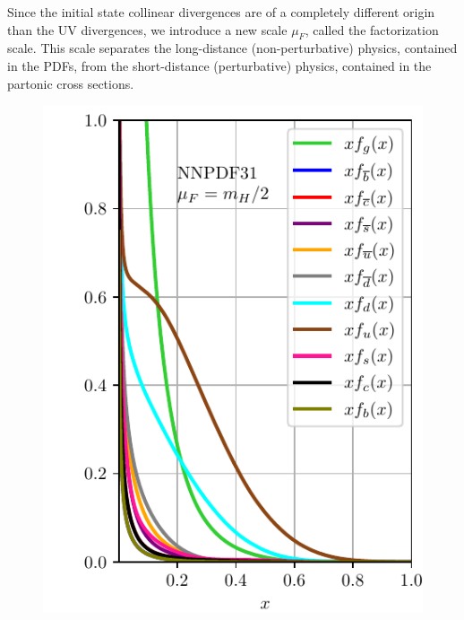 Since the initial state collinear divergences are of a completely different origin than the \acs{UV} divergences, we introduce a new scale $\mu_F$, called the factorization scale. This scale separates the long-distance (non-perturbative) physics, contained in the PDFs, from the short-distance (perturbative) physics, contained in the partonic cross sections.

\begin{figure}[h]
\begin{minipage}[t]{0.48\textwidth}
\centering
\includegraphics[width=\textwidth]{Images/PDF.pdf}
\label{fig:2:PDF}
\end{minipage}
\hspace{0.02\textwidth}
\begin{minipage}[t]{0.48\textwidth}

\end{minipage}
\end{figure}
